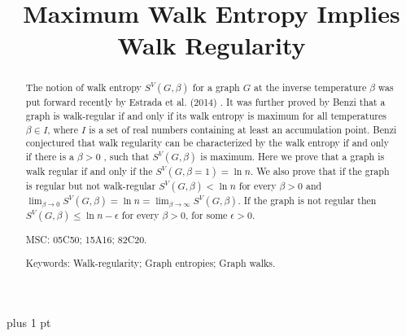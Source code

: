 \documentclass[12pt]{amsart}
\begin{document}
\baselineskip=18pt plus 1 pt

\title{Maximum Walk Entropy Implies Walk Regularity}
\maketitle
{}

\begin{abstract}
The notion of walk entropy $S^V(G,\beta)$  for a graph $G$   at the inverse temperature $\beta$  was put forward recently by Estrada et al. (2014) \cite{6}. It was further proved by Benzi \cite{1} that a graph is walk-regular if and only if its walk entropy is maximum for all temperatures $\beta \in I$, where $I$ is a set of real numbers containing at least an accumulation point. Benzi \cite{1} conjectured that walk regularity can be characterized by the walk entropy if and only if there is a $\beta>0$ , such that $S^V(G,\beta)$  is maximum. Here we prove that a graph is walk regular if and only if the $S^V(G,\beta=1)=\ln n$. We also prove that if the graph is regular but not walk-regular $S^V(G,\beta)<\ln n$  for every   $\beta >0$ and $\lim_{\beta \to 0} S^V(G,\beta)=\ln n=\lim_{\beta \to \infty} S^V(G,\beta)$. If the graph is not regular then 
$S^V(G,\beta) \leq \ln n-\epsilon$ for every $\beta>0$,  for some  $\epsilon>0$.

\qquad MSC: 05C50; 15A16; 82C20.

\qquad Keywords: Walk-regularity; Graph entropies; Graph walks.
\end{abstract}

	
\end{document}

